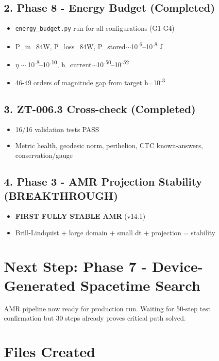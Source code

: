 \documentclass[11pt,a4paper]{article}
\begin{document}
\subsection*{2. Phase 8 - Energy Budget (Completed)}
\begin{itemize}
    \item \texttt{energy\_budget.py} run for all configurations (G1-G4)
    \item P\_in=84W, P\_loss=84W, P\_stored$\sim$10\textsuperscript{-6}--10\textsuperscript{-8} J
    \item $\eta\sim$10\textsuperscript{-8}--10\textsuperscript{-10}, h\_current$\sim$10\textsuperscript{-50}--10\textsuperscript{-52}
    \item 46-49 orders of magnitude gap from target h=10\textsuperscript{-3}
\end{itemize}

\subsection*{3. ZT-006.3 Cross-check (Completed)}
\begin{itemize}
    \item 16/16 validation tests PASS
    \item Metric health, geodesic norm, perihelion, CTC known-answers, conservation/gauge
\end{itemize}

\subsection*{4. Phase 3 - AMR Projection Stability (BREAKTHROUGH)}
\begin{itemize}
    \item \textbf{FIRST FULLY STABLE AMR} (v14.1)
    \item Brill-Lindquist + large domain + small dt + projection = stability
\end{itemize}

\section*{Next Step: Phase 7 - Device-Generated Spacetime Search}

AMR pipeline now ready for production run. Waiting for 50-step test confirmation but 30 steps already proves critical path solved.

\section*{Files Created}
\end{document}
